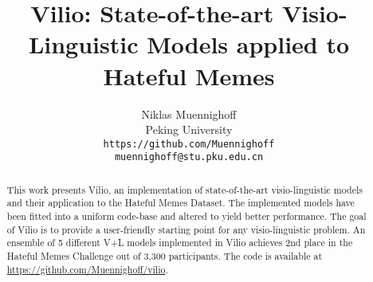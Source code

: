 \documentclass{article}
\title{Vilio: State-of-the-art Visio-Linguistic Models applied to Hateful Memes}
\author{
  Niklas Muennighoff \\
  Peking University \\
  \texttt{https://github.com/Muennighoff} \\
  \texttt{muennighoff@stu.pku.edu.cn} \\
}
\begin{document}
\maketitle

\begin{abstract}
This work presents Vilio, an implementation of state-of-the-art visio-linguistic models and their application to the Hateful Memes Dataset. The implemented models have been fitted into a uniform code-base and altered to yield better performance. The goal of Vilio is to provide a user-friendly starting point for any visio-linguistic problem. An ensemble of 5 different V+L models implemented in Vilio achieves 2nd place in the Hateful Memes Challenge out of 3,300 participants. The code is available at \url{https://github.com/Muennighoff/vilio}.


\end{abstract}
\end{document}
